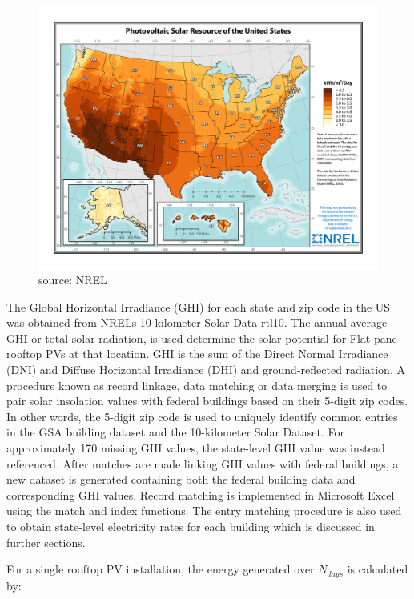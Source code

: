 \begin{figure}
  \begin{center}
    \includegraphics[scale=0.5]{pics/rtl_pic3}
  \end{center}
  \caption{source: NREL}
\label{fig:rtl_pic3}
\end{figure}

The Global Horizontal Irradiance (GHI) for each state and zip code in the US was obtained from NRELs 10-kilometer Solar Data \cite{roisin}{rtl10}. The annual average GHI or total solar radiation, is used determine the solar potential for Flat-pane rooftop PVs at that location. GHI is the sum of the Direct Normal Irradiance (DNI) and Diffuse Horizontal Irradiance (DHI) and ground-reflected radiation.  A procedure known as record linkage, data matching or data merging is used to pair solar insolation values with federal buildings based on their 5-digit zip codes.  In other words, the 5-digit zip code is used to uniquely identify common entries in the GSA building dataset and the 10-kilometer Solar Dataset. For approximately 170 missing GHI values, the state-level GHI value was instead referenced. After matches are made linking GHI values with federal buildings, a new dataset is generated containing both the federal building data and corresponding GHI values. Record matching is implemented in Microsoft Excel using the match and index functions.  The entry matching procedure is also used to obtain state-level electricity rates for each building which is discussed in further sections.  
\par
For a single rooftop PV installation, the energy generated over $N_{days}$ is calculated by:  

